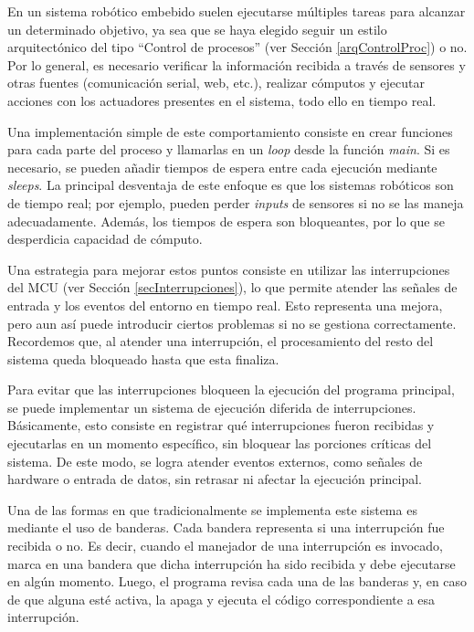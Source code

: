 En un sistema robótico embebido suelen ejecutarse múltiples tareas para alcanzar un determinado objetivo, ya sea que se haya elegido seguir un estilo arquitectónico del tipo ``Control de procesos'' (ver Sección \ref{arqControlProc}) o no. Por lo general, es necesario verificar la información recibida a través de sensores y otras fuentes (comunicación serial, web, etc.), realizar cómputos y ejecutar acciones con los actuadores presentes en el sistema, todo ello en tiempo real.


Una implementación simple de este comportamiento consiste en crear funciones para cada parte del proceso y llamarlas en un \textit{loop} desde la función \textit{main}. Si es necesario, se pueden añadir tiempos de espera entre cada ejecución mediante \textit{sleeps}. La principal desventaja de este enfoque es que los sistemas robóticos son de tiempo real; por ejemplo, pueden perder \textit{inputs} de sensores si no se las maneja adecuadamente. Además, los tiempos de espera son bloqueantes, por lo que se desperdicia capacidad de cómputo.


Una estrategia para mejorar estos puntos consiste en utilizar las interrupciones del \gls{MCU} (ver Sección \ref{secInterrupciones}), lo que permite atender las señales de entrada y los eventos del entorno en tiempo real. Esto representa una mejora, pero aun así puede introducir ciertos problemas si no se gestiona correctamente. Recordemos que, al atender una interrupción, el procesamiento del resto del sistema queda bloqueado hasta que esta finaliza.


Para evitar que las interrupciones bloqueen la ejecución del programa principal, se puede implementar un sistema de ejecución diferida de interrupciones. Básicamente, esto consiste en registrar qué interrupciones fueron recibidas y ejecutarlas en un momento específico, sin bloquear las porciones críticas del sistema. De este modo, se logra atender eventos externos, como señales de hardware o entrada de datos, sin retrasar ni afectar la ejecución principal.


Una de las formas en que tradicionalmente se implementa este sistema es mediante el uso de banderas. Cada bandera representa si una interrupción fue recibida o no. Es decir, cuando el manejador de una interrupción es invocado, marca en una bandera que dicha interrupción ha sido recibida y debe ejecutarse en algún momento. Luego, el programa revisa cada una de las banderas y, en caso de que alguna esté activa, la apaga y ejecuta el código correspondiente a esa interrupción.


